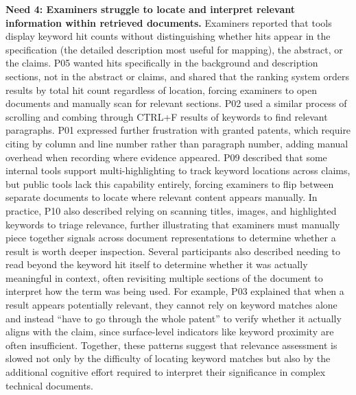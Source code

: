 \documentclass[sigconf]{acmart}
\begin{document}
\smallskip\noindent\textbf{Need 4: Examiners struggle to locate and interpret relevant information within retrieved documents.}
Examiners reported that tools display keyword hit counts without distinguishing whether hits appear in the specification (the detailed description most useful for mapping), the abstract, or the claims. P05 wanted hits specifically in the background and description sections, not in the abstract or claims, and shared that the ranking system orders results by total hit count regardless of location, forcing examiners to open documents and manually scan for relevant sections. P02 used a similar process of scrolling and combing through CTRL+F results of keywords to find relevant paragraphs. P01 expressed further frustration with granted patents, which require citing by column and line number rather than paragraph number, adding manual overhead when recording where evidence appeared. P09 described that some internal tools support multi-highlighting to track keyword locations across claims, but public tools lack this capability entirely, forcing examiners to flip between separate documents to locate where relevant content appears manually. In practice, P10 also described relying on scanning titles, images, and highlighted keywords to triage relevance, further illustrating that examiners must manually piece together signals across document representations to determine whether a result is worth deeper inspection. Several participants also described needing to read beyond the keyword hit itself to determine whether it was actually meaningful in context, often revisiting multiple sections of the document to interpret how the term was being used. For example, P03 explained that when a result appears potentially relevant, they cannot rely on keyword matches alone and instead ``have to go through the whole patent'' to verify whether it actually aligns with the claim, since surface-level indicators like keyword proximity are often insufficient. Together, these patterns suggest that relevance assessment is slowed not only by the difficulty of locating keyword matches but also by the additional cognitive effort required to interpret their significance in complex technical documents.
\end{document}
